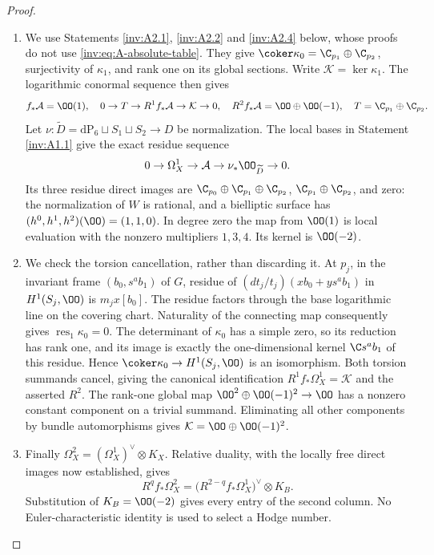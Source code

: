 \begin{proof}
\begin{enumerate}[label=\arabic*.,leftmargin=*]
\item We use Statements \ref{inv:A2.1}, \ref{inv:A2.2} and \ref{inv:A2.4} below, whose proofs do not use
\eqref{inv:eq:A-absolute-table}.  They give
$\coker\kappa_0=\C_{p_1}\oplus\C_{p_2}$,
surjectivity of $\kappa_1$, and rank one on its global sections.
Write $\mathcal K=\ker\kappa_1$.  The logarithmic conormal sequence
then gives
\[
f_*\mathcal A=\OO(1),\quad
0\to T\to R^1f_*\mathcal A\to\mathcal K\to0,\quad
R^2f_*\mathcal A=\OO\oplus\OO(-1),
\quad T=\C_{p_1}\oplus\C_{p_2}.
\]
Let $\nu:\widetilde D=\mathrm{dP}_6\sqcup S_1\sqcup S_2\to D$
be normalization.  The local bases in Statement \ref{inv:A1.1} give the exact
residue sequence
\[
0\to\Omega_X^1\to\mathcal A\to\nu_*\OO_{\widetilde D}\to0.
\]
Its three residue direct images are
$\C_{p_0}\oplus\C_{p_1}\oplus\C_{p_2}$,
$\C_{p_1}\oplus\C_{p_2}$, and zero: the normalization of $W$ is
rational, and a bielliptic surface has $(h^0,h^1,h^2)(\OO)=(1,1,0)$.
In degree zero the map from $\OO(1)$ is local evaluation with the
nonzero multipliers $1,3,4$.  Its kernel is $\OO(-2)$.

\item We check the torsion cancellation, rather than discarding it.  At
$p_j$, in the invariant frame $(b_0,s^ab_1)$ of $G$, residue of
$(dt_j/t_j)(x b_0+y s^ab_1)$ in $H^1(S_j,\OO)$ is $m_jx[b_0]$.
The residue factors through the base logarithmic line on the covering
chart.  Naturality of the connecting map consequently gives
$\operatorname{res}_1\kappa_0=0$.  The determinant of $\kappa_0$
has a simple zero, so its reduction has rank one, and its image is
exactly the one-dimensional kernel $\C s^ab_1$ of this residue.
Hence $\coker\kappa_0\to H^1(S_j,\OO)$ is an isomorphism.
Both torsion summands cancel, giving the canonical identification
$R^1f_*\Omega_X^1=\mathcal K$ and the asserted $R^2$.
The rank-one global map
$\OO^2\oplus\OO(-1)^2\to\OO$ has a nonzero constant component
on a trivial summand.  Eliminating all other components by bundle
automorphisms gives
$\mathcal K=\OO\oplus\OO(-1)^2$.

\item Finally $\Omega_X^2=(\Omega_X^1)^\vee\otimes K_X$.  Relative
duality, with the locally free direct images now established, gives
\[
R^qf_*\Omega_X^2
=\bigl(R^{2-q}f_*\Omega_X^1\bigr)^\vee\otimes K_B.
\]
Substitution of $K_B=\OO(-2)$ gives every entry of the second column.
No Euler-characteristic identity is used to select a Hodge number.
\end{enumerate}
\end{proof}

